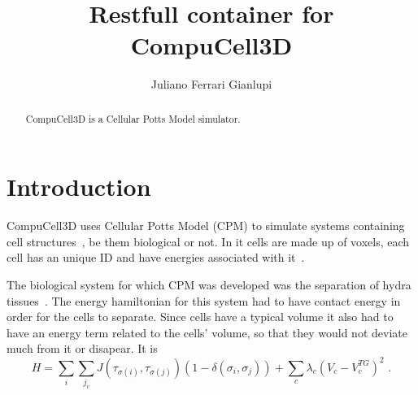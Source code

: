 
\title{Restfull container for CompuCell3D}

\author{Juliano Ferrari Gianlupi}


\renewcommand{\shortauthors}{J. F. Gianlupi}


\begin{abstract}

CompuCell3D is a Cellular Potts Model simulator. 

 
\end{abstract}



\maketitle

\section{Introduction}\label{hid-sp18-601-project-section-introduction}

CompuCell3D uses Cellular Potts Model (CPM) to simulate systems containing 
cell 
structures~\cite{hid-sp18-601-paper-swat2012multi}, be them biological or not.
 In it cells are made up of voxels, each cell has an unique ID and have energies
 associated with it~\cite{hid-sp18-601-paper-glazier1993simulation}.

The biological system for which CPM was developed was the separation of hydra 
tissues~\cite{hid-sp18-601-paper-glazier1993simulation}. The energy hamiltonian 
for this system had to have contact energy in order for the cells to separate. 
Since cells have a typical volume it also had to have an energy term related to 
the cells' volume, so that they would not  deviate much from it or disapear. 
It is
\begin{equation}\label{hid-sp18-601-equation-cpm-orig-hamiltonian}
H = \sum_i \sum_{j_v} J(\tau_{\sigma(i)},\tau_{\sigma(j)
})(1 - \delta(\sigma_i,\sigma_j)) + \sum_{c}\lambda_{c}\left(V_{c
} - V^{TG}_{c}\right)^2\,\,.
\end{equation}


\section{}\label{}



\subsection{}\label{}




 

